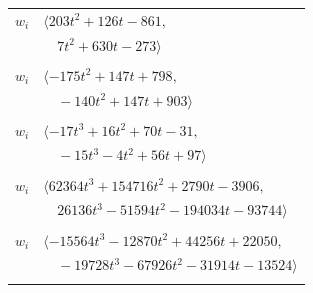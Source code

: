 \documentclass[11pt]{article}
\begin{document}
\begin{longtable}{@{}ll@{}}
$w_i$ & $\langle 203t^{2}+126t-861,$\\
 & $\quad 7t^{2}+630t-273\rangle$\\
\addlinespace[2pt]
\multicolumn{2}{@{}p{0.97\textwidth}@{}}{$i=37$, $D_i=1$, $\rho_{ij}$: $3{:}1, \allowbreak 9{:}1, \allowbreak 11{:}2, \allowbreak 17{:}1, \allowbreak 24{:}1, \allowbreak 29{:}2, \allowbreak 33{:}1, \allowbreak 39{:}1, \allowbreak 60{:}1, \allowbreak 61{:}1, \allowbreak 62{:}1, \allowbreak 65{:}2, \allowbreak 67{:}1, \allowbreak 68{:}2, \allowbreak 72{:}2$}\\
$w_i$ & $\langle -175t^{2}+147t+798,$\\
 & $\quad -140t^{2}+147t+903\rangle$\\
\addlinespace[2pt]
\multicolumn{2}{@{}p{0.97\textwidth}@{}}{$i=38$, $D_i=1$, $\rho_{ij}$: $8{:}2, \allowbreak 12{:}2, \allowbreak 16{:}2, \allowbreak 18{:}1, \allowbreak 26{:}1, \allowbreak 29{:}1, \allowbreak 33{:}2, \allowbreak 40{:}2, \allowbreak 61{:}2$}\\
$w_i$ & $\langle -17t^{3}+16t^{2}+70t-31,$\\
 & $\quad -15t^{3}-4t^{2}+56t+97\rangle$\\
\addlinespace[2pt]
\multicolumn{2}{@{}p{0.97\textwidth}@{}}{$i=39$, $D_i=1$, $\rho_{ij}$: $1{:}2, \allowbreak 4{:}2, \allowbreak 14{:}2, \allowbreak 18{:}1, \allowbreak 20{:}2, \allowbreak 27{:}1, \allowbreak 37{:}2, \allowbreak 40{:}1, \allowbreak 47{:}1, \allowbreak 60{:}2, \allowbreak 65{:}2, \allowbreak 68{:}1, \allowbreak 70{:}1, \allowbreak 71{:}2, \allowbreak 72{:}1, \allowbreak 84{:}2$}\\
$w_i$ & $\langle 62364t^{3}+154716t^{2}+2790t-3906,$\\
 & $\quad 26136t^{3}-51594t^{2}-194034t-93744\rangle$\\
\addlinespace[2pt]
\multicolumn{2}{@{}p{0.97\textwidth}@{}}{$i=40$, $D_i=1$, $\rho_{ij}$: $1{:}1, \allowbreak 4{:}1, \allowbreak 6{:}1, \allowbreak 9{:}2, \allowbreak 12{:}2, \allowbreak 13{:}1, \allowbreak 14{:}2, \allowbreak 19{:}2, \allowbreak 26{:}2, \allowbreak 36{:}1, \allowbreak 38{:}1, \allowbreak 39{:}2, \allowbreak 61{:}1, \allowbreak 72{:}1, \allowbreak 74{:}1, \allowbreak 89{:}2$}\\
$w_i$ & $\langle -15564t^{3}-12870t^{2}+44256t+22050,$\\
 & $\quad -19728t^{3}-67926t^{2}-31914t-13524\rangle$\\
\addlinespace[2pt]
\multicolumn{2}{@{}p{0.97\textwidth}@{}}{$i=41$, $D_i=1$, $\rho_{ij}$: $34{:}2, \allowbreak 57{:}2, \allowbreak 64{:}1$}\\

\end{longtable}
\end{document}
